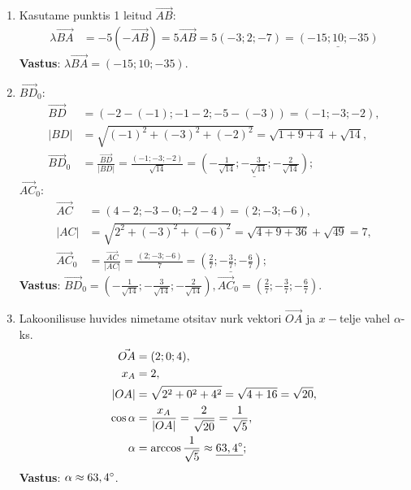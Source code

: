 \documentclass[10pt, a4paper]{article}
\begin{document}
\begin{enumerate}
\item
    Kasutame punktis 1 leitud $\vec{AB}$:
    \begin{align}
        \nonumber
        \lambda\vec{BA} &= -5(-\vec{AB}) = 5\vec{AB} = 5(-3; 2; -7) = 
        \underline{(-15; 10; -35)}
    \end{align}
    \textbf{Vastus}: $\lambda\vec{BA} = (-15; 10; -35)$.

\item
    $\vec{BD}_0$:
    \begin{align}
        \nonumber
        \vec{BD} &= (-2 - (-1); -1 - 2; -5 - (-3)) = (-1; -3; -2),\\ 
        \nonumber
        \lvert BD \rvert &= \sqrt{(-1)^2 + (-3)^2 + (-2)^2} = \sqrt{1 + 9 + 4} + \sqrt{14}, \\ 
        \nonumber
        \vec{BD}_0 &= \frac{\vec{BD}}{\lvert BD \rvert} = \frac{(-1; -3; -2)}{\sqrt{14}} = \underline{(-\frac{1}{\sqrt{14}}; -\frac{3}{\sqrt{14}}; -\frac{2}{\sqrt{14}})};
    \end{align}    
    $\vec{AC}_0$:    
    \begin{align}
        \nonumber
        \vec{AC} &= (4 - 2; -3 - 0; -2 - 4) = (2; -3; -6),\\
        \nonumber
        \lvert AC \rvert &= \sqrt{2^2 + (-3)^2 + (-6)^2} = \sqrt{4 + 9 + 36} + \sqrt{49} = 7,\\ 
        \nonumber
        \vec{AC}_0 &= \frac{\vec{AC}}{\lvert AC \rvert} = \frac{(2; -3; -6)}{7} = \underline{(\frac{2}{7}; -\frac{3}{7}; -\frac{6}{7})};
    \end{align}
    \textbf{Vastus}: $\vec{BD}_0 = (-\frac{1}{\sqrt{14}}; -\frac{3}{\sqrt{14}}; -\frac{2}{\sqrt{14}}), \vec{AC}_0 = (\frac{2}{7}; -\frac{3}{7}; -\frac{6}{7})$.

\item
    Lakoonilisuse huvides nimetame otsitav nurk vektori $\vec{OA}$ ja $x-$telje vahel $\alpha$-ks.
    \begin{align}
        \nonumber
        \vec{OA} &= (2; 0; 4), \\
        \nonumber
        x_A &= 2, \\
        \nonumber
        \lvert OA \lvert &= \sqrt{2^2 + 0^2 + 4^2} = \sqrt{4 + 16} = \sqrt{20}, \\
        \nonumber
        \cos \alpha &= \frac{x_A}{\lvert OA \lvert} = \frac{2}{\sqrt{20}} = \frac{1}{\sqrt{5}},\\
        \nonumber
        \alpha &= \arccos \frac{1}{\sqrt{5}} \approx \underline{63,4\degree};
    \end{align}
    \textbf{Vastus}: $\alpha \approx 63,4\degree$.


\end{enumerate}
\end{document}
